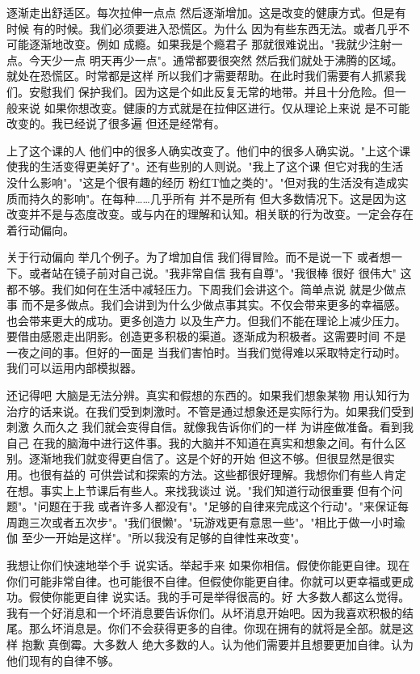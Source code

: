 逐渐走出舒适区。每次拉伸一点点 然后逐渐增加。这是改变的健康方式。但是有时候 有的时候。我们必须要进入恐慌区。为什么 因为有些东西无法。或者几乎不可能逐渐地改变。例如 成瘾。如果我是个瘾君子 那就很难说出。"我就少注射一点。今天少一点 明天再少一点"。通常都要很突然 然后我们就处于沸腾的区域。就处在恐慌区。时常都是这样 所以我们才需要帮助。在此时我们需要有人抓紧我们。安慰我们 保护我们。因为这是个如此反复无常的地带。并且十分危险。但一般来说 如果你想改变。健康的方式就是在拉伸区进行。仅从理论上来说 是不可能改变的。我已经说了很多遍 但还是经常有。 

上了这个课的人 他们中的很多人确实改变了。他们中的很多人确实说。"上这个课使我的生活变得更美好了"。还有些别的人则说。"我上了这个课 但它对我的生活没什么影响"。"这是个很有趣的经历 粉红T恤之类的"。"但对我的生活没有造成实质而持久的影响"。在每种……几乎所有 并不是所有 但大多数情况下。这是因为这改变并不是与态度改变。或与内在的理解和认知。相关联的行为改变。一定会存在着行动偏向。 

关于行动偏向 举几个例子。为了增加自信 我们得冒险。而不是说一下 或者想一下。或者站在镜子前对自己说。"我非常自信 我有自尊"。"我很棒 很好 很伟大" 这都不够。我们如何在生活中减轻压力。下周我们会讲这个。简单点说 就是少做点事 而不是多做点。我们会讲到为什么少做点事其实。不仅会带来更多的幸福感。也会带来更大的成功。更多创造力 以及生产力。但我们不能在理论上减少压力。要借由感恩走出阴影。创造更多积极的渠道。逐渐成为积极者。这需要时间 不是一夜之间的事。但好的一面是 当我们害怕时。当我们觉得难以采取特定行动时。我们可以运用内部模拟器。 

还记得吧 大脑是无法分辨。真实和假想的东西的。如果我们想象某物 用认知行为治疗的话来说。在我们受到刺激时。不管是通过想象还是实际行为。如果我们受到刺激 久而久之 我们就会变得自信。就像我告诉你们的一样 为讲座做准备。看到我自己 在我的脑海中进行这件事。我的大脑并不知道在真实和想象之间。有什么区别。逐渐地我们就变得更自信了。这是个好的开始 但这不够。但很显然是很实用。也很有益的 可供尝试和探索的方法。这些都很好理解。我想你们有些人肯定在想。事实上上节课后有些人。来找我谈过 说。"我们知道行动很重要 但有个问题"。"问题在于我 或者许多人都没有"。"足够的自律来完成这个行动"。"来保证每周跑三次或者五次步"。"我们很懒"。"玩游戏更有意思一些"。"相比于做一小时瑜伽 至少一开始是这样"。"所以我没有足够的自律性来改变"。 

我想让你们快速地举个手 说实话。举起手来 如果你相信。假使你能更自律。现在你们可能非常自律。也可能很不自律。但假使你能更自律。你就可以更幸福或更成功。假使你能更自律 说实话。我的手可是举得很高的。好 大多数人都这么觉得。我有一个好消息和一个坏消息要告诉你们。从坏消息开始吧。因为我喜欢积极的结尾。那么坏消息是。你们不会获得更多的自律。你现在拥有的就将是全部。就是这样 抱歉 真倒霉。大多数人 绝大多数的人。认为他们需要并且想要更加自律。认为他们现有的自律不够。 


